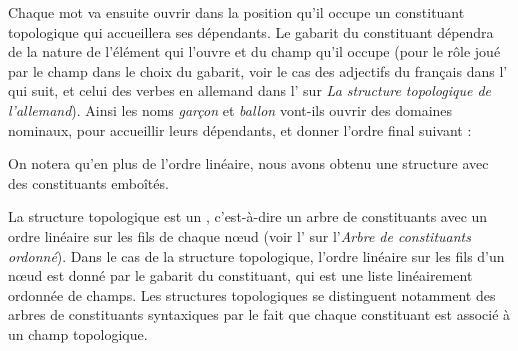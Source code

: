 Chaque mot va ensuite ouvrir dans la position qu’il occupe un constituant topologique qui accueillera ses dépendants. Le gabarit du constituant dépendra de la nature de l’élément qui l’ouvre et du champ qu’il occupe (pour le rôle joué par le champ dans le choix du gabarit, voir le cas des adjectifs du français dans l’ qui suit, et celui des verbes en allemand dans l’ sur \textit{La structure topologique de l’allemand}). Ainsi les noms \textit{garçon} et \textit{ballon} vont-ils ouvrir des domaines nominaux, pour accueillir leurs dépendants, et donner l’ordre final suivant :

\ea\label{ex:topo-ballon}%
\z

On notera qu’en plus de l’ordre linéaire, nous avons obtenu une structure avec des constituants emboîtés.\largerpage


La structure topologique est un , c’est-à-dire un arbre de constituants  avec un ordre linéaire sur les fils de chaque nœud (voir l’ sur l'\textit{Arbre de constituants ordonné}). Dans le cas de la structure topologique, l’ordre linéaire sur les fils d’un nœud est donné par le gabarit du constituant, qui est une liste linéairement ordonnée de champs. Les structures topologiques se distinguent notamment des arbres de constituants syntaxiques par le fait que chaque constituant est associé à un champ topologique.

